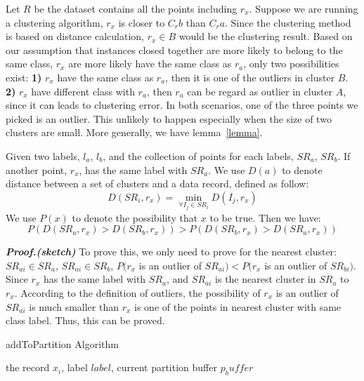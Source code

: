 \documentclass[runningheads]{llncs}
\begin{document}
	Let $R$ be the dataset contains all the points including $r_x$. Suppose we are running a clustering algorithm, $r_x$ is closer to $C_rb$ than $C_ra$. Since the clustering method is based on distance calculation, $r_x \in B$ would be the clustering result. Based on our assumption that instances closed together are more likely to belong to the same class, $r_x$ are more likely have the same class as $r_a$, only two possibilities exist: \textbf{1)} $r_x$ have the same class as $r_a$, then it is one of the outliers in cluster $B$. \textbf{2)} $r_x$ have different class with $r_a$, then $r_a$ can be regard as outlier in cluster $A$, since it can leads to clustering error. In both scenarios, one of the three points we picked is an outlier. This unlikely to happen especially when the size of two clusters are small. More generally, we have lemma~\ref{lemma}.
	
	\begin{lemma} \label{lemma}
		Given two labels, $l_a$, $l_b$, and the collection of points for each labels, $SR_a$, $SR_b$. If another point, $r_x$, has the same label with $SR_a$. We use $D(a)$ to denote distance between a set of clusters and a data record, defined as follow:
		\begin{displaymath}
		D(SR_i, r_x) = \min_{\forall I_j \in SR_i} D(I_j, r_x) 
		\end{displaymath}
		We use $P(x)$ to denote the possibility that $x$ to be true. Then we have:
		\begin{displaymath}
		P(D(SR_a, r_x) > D(SR_b, r_x)) > P(D(SR_b, r_x) > D(SR_a, r_x))
		\end{displaymath}
	\end{lemma}
	
	\textbf{\textit{Proof.(sketch)}} 
	To prove this, we only need to prove for the nearest cluster: $SR_{ai} \in SR_a$, $SR_{ai} \in SR_b$, $P(r_x$ is an outlier of $SR_{ai}) < P(r_x$ is an outlier of $SR_{bi})$. Since $r_x$ has the same label with $SR_a$, and $SR_{ai}$ is the nearest cluster in $SR_a$ to $r_x$. According to the definition of outliers, the possibility of $r_x$ is an outlier of $SR_{ai}$ is much smaller than $r_x$ is one of the points in nearest cluster with same class label. Thus, this can be proved.
	
	\begin{algorithm}
		\caption{addToPartition Algorithm} \label{algorithm:clustering}
		\begin{algorithmic}
			\REQUIRE the record $x_i$, label $label$, current partition buffer $p_buffer$
			\ELSE 
			\ENDFOR
			\ENDIF
		\end{algorithmic}
	\end{algorithm}
	
\end{document}
